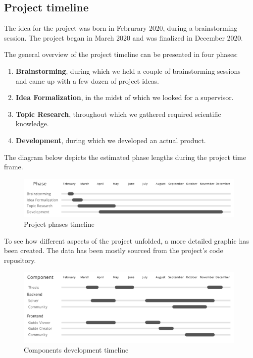 \subsection{Project timeline}

The idea for the project was born in Februrary 2020, during a brainstorming session.
The project began in March 2020 and was finalized in December 2020.

\medskip

The general overview of the project timeline can be presented in four phases:
\begin{enumerate}
	\item \textbf{Brainstorming}, during which we held a couple of brainstorming sessions and came up with a few dozen of project ideas.
	\item \textbf{Idea Formalization}, in the midst of which we looked for a supervisor.
	\item \textbf{Topic Research}, throughout which we gathered required scientific knowledge.
	\item \textbf{Development}, during which we developed an actual product.
\end{enumerate}

The diagram below depicts the estimated phase lengths during the project time frame.

\begin{figure}[H]
\label{4-project-phases}
  \caption{Project phases timeline}
  \centering
    \includegraphics[width=\textwidth]{assets/4-phases.png}
\end{figure}

To see how different aspects of the project unfolded, a more detailed graphic has been created. The data has been mostly sourced from the project's code repository.

\begin{figure}[H]
	\label{04-component-timeline}
	\caption{Components development timeline}
  	\centering
    \includegraphics[width=1.01\textwidth]{assets/4-component-timeline.png}
\end{figure}

